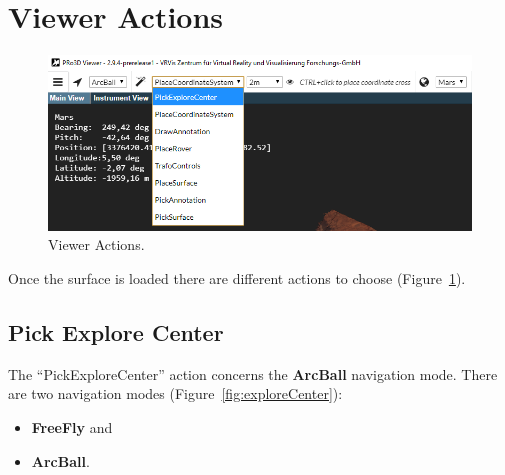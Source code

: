 \section{Viewer Actions}

\begin{figure}[h]
    	\centering
    		\includegraphics[width=1\textwidth]{pics/Interactions.png}
    	\caption[Interactions]{Viewer Actions.}
    	\label{fig:Interactions}
   \end{figure}

Once the surface is loaded there are different actions to choose (Figure~\ref{fig:Interactions}).
\subsection{Pick Explore Center}
\label{sec:pickEC}

The ``PickExploreCenter'' action concerns the \textbf{ArcBall} navigation mode. There are two navigation modes (Figure~\ref{fig:exploreCenter}):
\begin{itemize}
	\item \textbf{FreeFly} and 
	\item \textbf{ArcBall}.
\end{itemize}

